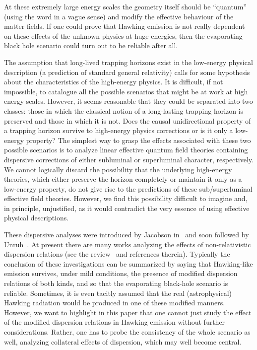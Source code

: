 \documentclass[11pt,a4paper]{article}
\begin{document}
At these extremely large energy scales the geometry itself should be
``quantum'' (using the word in a vague sense) and modify the effective behaviour
of the matter fields.  If one could  prove that Hawking emission is not
really dependent on these effects of the unknown physics at huge energies, then
the evaporating black hole scenario could turn out to be reliable after all. 

The assumption that long-lived trapping horizons exist in the low-energy physical description (a prediction of standard general relativity) calls for some hypothesis about the characteristics of the high-energy physics. It is difficult, if not impossible, to catalogue all the possible scenarios that might be at work at high energy scales.  However, it seems reasonable that they
could be separated into two classes: those in which the classical notion of a
long-lasting trapping horizon is preserved and those in which it is not.  Does
the causal unidirectional property of a trapping horizon survive to high-energy
physics corrections or  is it only a low-energy property? The simplest way to
grasp the effects associated with these two possible scenarios is to analyze
linear effective quantum field theories containing dispersive corrections of either
subluminal or superluminal character, respectively. We cannot logically discard the
possibility that the underlying high-energy theories, which either preserve the horizon completely or maintain it only as a low-energy property, do not give rise to the
predictions of these sub/superluminal effective field theories. However, we find this
possibility difficult to imagine and, in principle, unjustified, as it would contradict the very essence of using effective physical descriptions. 

These dispersive analyses were introduced by Jacobson in~\cite{jacobson,jacobson2} and soon
followed by Unruh~\cite{unruh-sub}. At present there are many works analyzing
the effects of non-relativistic dispersion relations (see the
review~\cite{barcelo-lrr} and references therein). 
Typically the conclusion of these investigations can be summarized by saying
that Hawking-like emission survives, under mild conditions, the presence of
modified dispersion relations of both kinds, and so that the evaporating
black-hole scenario is reliable. Sometimes, it is even tacitly assumed that the
real (astrophysical) Hawking radiation would be produced in one of these modified manners. 
However,  we want to highlight in this paper  that one cannot just study the
effect of the modified dispersion relations in Hawking emission without further
considerations. Rather, one has to probe the consistency of the whole scenario as
well, analyzing collateral effects of dispersion, which may well become central.
\end{document}
